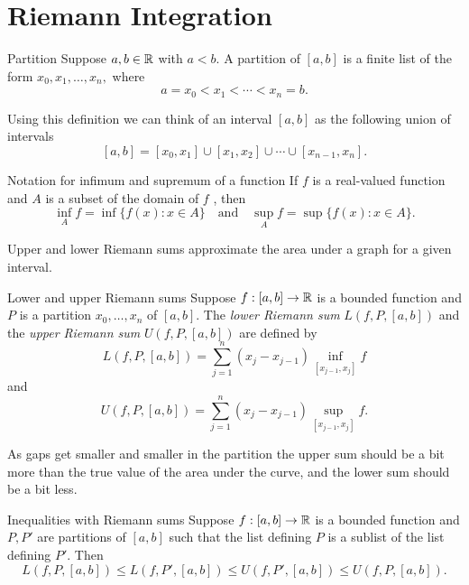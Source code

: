 \documentclass[twoside, openright, fontsize=10pt, headings=big]{scrbook}
\begin{document}


\frontmatter
\tableofcontents
\mainmatter

\chapter{Riemann Integration}
\begin{definition}{Partition}{}
    Suppose $a, b \in \mathbb{R}$ with $a < b$. A partition of $[a, b]$ is a finite list of the form $x_0, x_1, \dots , x_n,$ where
    \[
        a=x_0<x_1<\cdots<x_n=b.
    \]
\end{definition}
Using this definition we can think of an interval $[a,b]$ as the following union of intervals
\[
    [a,b]=[x_0,x_1]\cup[x_1,x_2]\cup\cdots\cup[x_{n-1},x_n].
\]
\begin{definition}{Notation for infimum and supremum of a function}{}
    If $f$ is a real-valued function and $A$ is a subset of the domain of $f$ , then
    \[
        \underset{A}{\inf} f=\inf\{f(x):x\in A\}\quad\text{and}\quad \underset{A}{\sup} f=\sup\{f(x):x\in A\}.
    \]
\end{definition}
Upper and lower Riemann sums approximate the area under a graph for a given interval.
\begin{definition}{Lower and upper Riemann sums}
    Suppose $f : [a, b] \to \mathbb{R}$ is a bounded function and $P$ is a partition $x_0,\dots,x_n$ of $[a, b]$. The \textit{lower Riemann sum} $L( f , P, [a, b])$ and the \textit{upper Riemann sum} $U( f , P, [a, b])$ are defined by
    \[
        L( f , P, [a, b])=\sum_{j=1}^{n}(x_j-x_{j-1})\underset{[x_{j-1},x_j]}{\inf}f
    \]
    and
    \[
        U( f , P, [a, b])=\sum_{j=1}^{n}(x_j-x_{j-1})\underset{[x_{j-1},x_j]}{\sup}f.
    \]
\end{definition}
As gaps get smaller and smaller in the partition the upper sum should be a bit more than the true value of the area under the curve, and the lower sum should be a bit less.
\begin{lemma}{Inequalities with Riemann sums}{}
    Suppose $f : [a, b] \to \mathbb{R}$ is a bounded function and $P, P'$ are partitions of $[a, b]$ such that the list defining $P$ is a sublist of the list defining $P'$. Then
    \[
        L(f,P,[a,b])\leq L(f,P',[a,b])\leq U(f,P',[a,b])\leq U(f,P,[a,b]).
    \]
\end{lemma}
\end{document}
